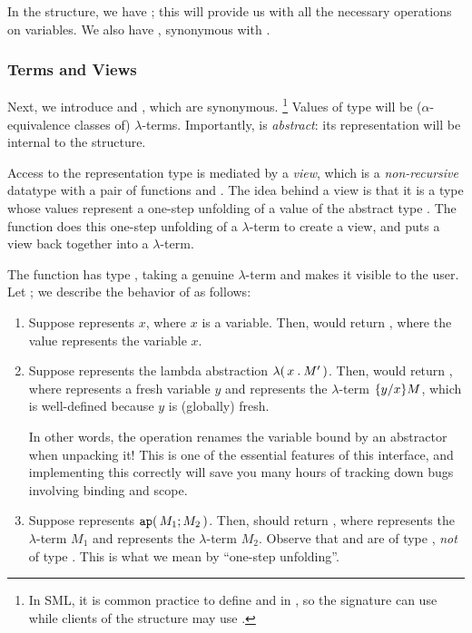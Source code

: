 \documentclass[11pt]{article}
\begin{document}
In the  structure, we have ; this will provide us with all the necessary operations on variables.
We also have , synonymous with .

\subsubsection{Terms and Views}

Next, we introduce  and , which are synonymous.%
\footnote{In SML, it is common practice to define  and  in , so the signature can use  while clients of the structure may use .}
Values of type  will be ($\alpha$-equivalence classes of) $\lambda$-terms.
Importantly,  is \emph{abstract}: its representation will be internal to the structure.

Access to the representation type  is mediated by a \emph{view}, which is a \emph{non-recursive} datatype  with a pair of functions  and .
The idea behind a view is that it is a type whose values represent a one-step unfolding of a value of the abstract type .
The function  does this one-step unfolding of a $\lambda$-term to create a view, and  puts a view back together into a $\lambda$-term.

The function  has type , taking a genuine $\lambda$-term and makes it visible to the user.
Let ; we describe the behavior of  as follows:
\begin{enumerate}
  \item
    Suppose  represents $x$, where $x$ is a variable.
    Then,  would return , where the value
     represents the variable $x$.

  \item
    Suppose  represents the lambda abstraction ${\lambda}\mathtt{(}\,{x}\mathbin{\mathtt{.}}{M'}\,\mathtt{)}$.
    Then,  would return , where  represents a fresh variable $y$ and  represents the $\lambda$-term $\{{y}\mathord{/}{x}\}{M}$, which is well-defined because $y$ is (globally) fresh.

    In other words, the  operation renames the variable bound by
    an abstractor when unpacking it!
    This is one of the essential features of this interface, and implementing this correctly will save you many hours of tracking down bugs involving binding and scope.

  \item
    Suppose  represents ${\mathtt{ap}}\mathtt{(}\,M_1;M_2\,\mathtt{)}$.
    Then,  should return , where  represents the $\lambda$-term $M_1$ and  represents the $\lambda$-term $M_2$.
    Observe that  and  are of type , \emph{not} of type .
    This is what we mean by ``one-step unfolding''.
\end{enumerate}
\end{document}
